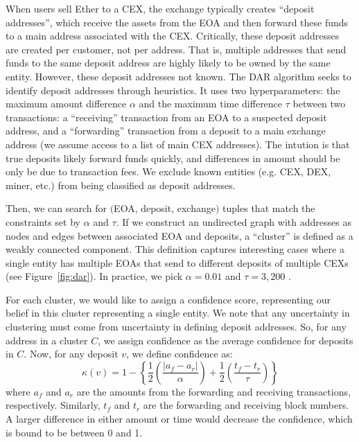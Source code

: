 \documentclass[11pt,a4paper]{article}
\begin{document}
When users sell Ether to a CEX, the exchange typically creates ``deposit addresses'', which receive the assets from the EOA and then forward these funds to a main address associated with the CEX. Critically, these deposit addresses are created per customer, not per address. That is, multiple addresses that send funds to the same deposit address are highly likely to be owned by the same entity. However, these deposit addresses not known. The DAR algorithm seeks to identify deposit addresses through heuristics.
It uses two hyperparameters: the maximum amount difference $\alpha$ and the maximum time difference $\tau$ between two transactions: a ``receiving'' transaction from an EOA to a suspected deposit address, and a ``forwarding'' transaction from a deposit to a main exchange address (we assume access to a list of main CEX addresses). The intution is that true deposits likely forward funds quickly, and differences in amount should be only be due to transaction fees. We exclude known entities (e.g. CEX, DEX, miner, etc.) from being classified as deposit addresses.

Then, we can search for $($EOA, deposit, exchange$)$ tuples that match the constraints set by $\alpha$ and $\tau$.
If we construct an undirected graph with addresses as nodes and edges between associated EOA and deposits, a ``cluster'' is defined as a weakly connected component. This definition captures interesting cases where a single entity has multiple EOAs that send to different deposits of multiple CEXs (see Figure~\ref{fig:dar}). In practice, we pick $\alpha = 0.01$ and $\tau = 3,200$ \citep{victor2020address}.

For each cluster, we would like to assign a confidence score, representing our belief in this cluster representing a single entity. We note that any uncertainty in clustering must come from uncertainty in defining deposit addresses. So, for any address in a cluster $C$, we assign  confidence as the average confidence for deposits in $C$. Now, for any deposit $v$, we define confidence as:
\begin{equation*}
\kappa(v) = 1 - \left\{ \frac{1}{2}\left(\frac{|a_f - a_r|}{\alpha}\right) + \frac{1}{2}\left(\frac{t_f - t_r}{\tau}\right) \right\}
\end{equation*}
where $a_f$ and $a_r$ are the amounts from the forwarding and receiving transactions, respectively. Similarly, $t_f$ and $t_r$ are the forwarding and receiving block numbers.
A larger difference in either amount or time would decrease the confidence, which is bound to be between 0 and 1.
\end{document}
